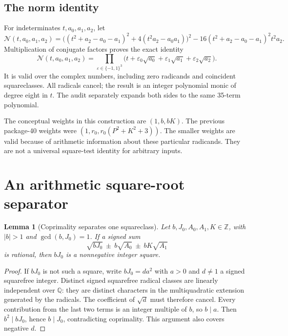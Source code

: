 \documentclass[11pt,letterpaper]{article}
\newtheorem{lemma}[theorem]{Lemma}
\theoremstyle{remark}\newtheorem{remark}[theorem]{Remark}
\newcommand{\Z}{\mathbb Z}\newcommand{\N}{\mathbb N}
\begin{document}
\subsection{The norm identity}
For indeterminates $t,a_0,a_1,a_2$, let
\[
 \mathcal N(t,a_0,a_1,a_2)
 =\bigl((t^2+a_2-a_0-a_1)^2+4(t^2a_2-a_0a_1)\bigr)^2
 -16(t^2+a_2-a_0-a_1)^2t^2a_2.
\]
Multiplication of conjugate factors proves the exact identity
\begin{equation}\label{eq:norm}
\mathcal N(t,a_0,a_1,a_2)
 =\prod_{\varepsilon\in\{-1,1\}^3}
 \bigl(t+\varepsilon_0\sqrt{a_0}
         +\varepsilon_1\sqrt{a_1}
         +\varepsilon_2\sqrt{a_2}\bigr).
\end{equation}
It is valid over the complex numbers, including zero radicands and
coincident squareclasses. All radicals cancel; the result is an integer
polynomial monic of degree eight in $t$. The audit separately expands
both sides to the same 35-term polynomial.

The conceptual weights in this construction are $(1,b,bK)$.
The previous package-40 weights were
$(1,r_0,r_0(P^2+K^2+3))$. The smaller weights are valid because of
arithmetic information about these particular radicands. They are
not a universal square-test identity for arbitrary inputs.

\section{An arithmetic square-root separator}\label{sec:separator}
\begin{lemma}[Coprimality separates one squareclass]\label{lem:coprime}
Let $b,J_0,A_0,A_1,K\in\Z$, with $|b|>1$ and
$\gcd(b,J_0)=1$. If a signed sum
\[
 \sqrt{bJ_0}\ \mathbin{\pm}\ b\sqrt{A_0}\
                  \mathbin{\pm}\ bK\sqrt{A_1}
\]
is rational, then $bJ_0$ is a nonnegative integer square.
\end{lemma}
\begin{proof}
If $bJ_0$ is not such a square, write $bJ_0=da^2$ with $a>0$ and
$d\ne1$ a signed squarefree integer. Distinct signed squarefree radical
classes are linearly independent over $\mathbb Q$: they are distinct
characters in the multiquadratic extension generated by the radicals.
The coefficient of $\sqrt d$ must therefore cancel. Every contribution
from the last two terms is an integer multiple of $b$, so $b\mid a$.
Then $b^2\mid bJ_0$, hence $b\mid J_0$, contradicting coprimality.
This argument also covers negative $d$.
\end{proof}
\end{document}
